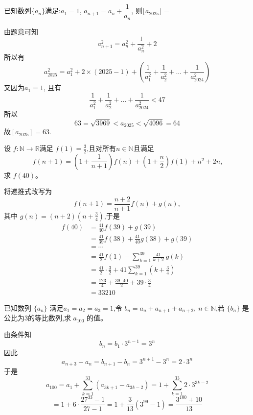 \begin{questions}
    \question 已知数列$\{a_n\}$满足:$a_1 =1$, $a_{n+1} = a_n + \dfrac{1}{a_n}$, 则$\lfloor a_{2025}\rfloor=$
    \begin{solution}
        由题意可知$$a_{n+1}^2 = a_n^2 + \frac{1}{a_n^2} + 2$$所以有
        $$a_{2025}^2 = a_1^2 + 2 \times (2025-1) + \left(\frac{1}{a_1^2} + \frac{1}{a_2^2} + \dots + \frac{1}{a_{2024}^2}\right)$$又因为$a_1=1$, 且有
        $$\frac{1}{a_1^2} + \frac{1}{a_2^2} + \dots + \frac{1}{a_{2024}^2} < 47$$所以$$63=\sqrt{3969} < a_{2025} < \sqrt{4096}=64$$故$[a_{2025}]=63$.
    \end{solution}

    \question 设 $f:\mathbb{N} \to \mathbb{R}$满足 $f(1) = \frac{3}{2}$,且对所有$n \in \mathbb{N}$且满足$$\ f(n+1) = \left(1 + \frac{1}{n+1}\right) f(n) + \left(1 + \frac{n}{2}\right) f(1) + n^2 + 2n,$$ 求 $f(40)$。
    \begin{solution}
        将递推式改写为
        \[
        f(n+1) = \frac{n+2}{n+1} f(n) + g(n),
        \]
        其中 $\displaystyle g(n) = (n+2)\left(n + \frac{3}{4}\right)$,于是
        \begin{align*}
        f(40) &= \frac{41}{40} f(39) + g(39) \\
        &= \frac{41}{39} f(38) + \frac{41}{40} g(38) + g(39) \\
        &= \cdots \\
        &= \frac{41}{2} f(1) + \sum_{k=1}^{39} \frac{41}{k+2}\ g(k) \\
        &= \frac{41}{2} \cdot \frac{3}{2} + 41 \sum_{k=1}^{39} (k+\frac{3}{4}) \\
        &= \frac{123}{4} + \frac{39\cdot 40}{2}+39\cdot \frac{3}{4}\\
        &= 33210
        \end{align*}
    \end{solution}
    
    \question 已知数列 $\{a_{n}\}$ 满足$a_{1}=a_{2}=a_{3}=1$,令 $b_{n}=a_{n}+a_{n+1}+a_{n+2},\ n\in \mathbb{N}$,若 $\{b_{n}\}$ 是公比为3的等比数列,求 $a_{100}$ 的值。
    \begin{solution}
        由条件知 $$b_{n}=b_{1}\cdot3^{n-1}=3^{n}$$
        因此$$a_{n+3}-a_{n}=b_{n+1}-b_{n}=3^{n+1}-3^{n}=2\cdot3^{n}$$
        于是
        $$a_{100}=a_{1}+\sum_{k=1}^{33}(a_{3k+1}-a_{3k-2})=1+\sum_{k=1}^{33}2\cdot3^{3k-2}$$
        $$=1+6\cdot\frac{27^{33}-1}{27-1}=1+\frac{3}{13}(3^{99}-1)=\frac{3^{100}+10}{13}$$
    \end{solution}


\end{questions}
